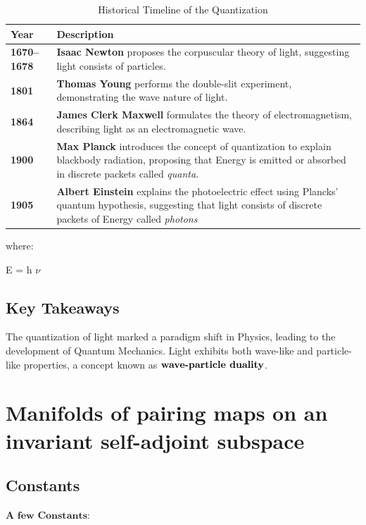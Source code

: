 \documentclass[a4paper, 10pt, onepage]{elegantbook}
\begin{document}
{\begin{table}[ht]
\centering
\caption{Historical Timeline of the Quantization}
\label{tab:quantization}
\begin{tabular}{|l|p{6cm}|}
\hline
\textbf{Year} & \textbf{Description} \\ \hline
\textbf{1670--1678}          &  \textbf{Isaac Newton} proposes the corpuscular theory of light, suggesting light 
consists of particles.  \\ \hline    \textbf{1801}                &  \textbf{Thomas Young} performs the double-slit 
experiment, demonstrating the wave nature of light. \\    \hline
\textbf{1864}                &  \textbf{James Clerk Maxwell} formulates the theory of electromagnetism, describing 
light as an electromagnetic wave.  \\ \hline
\textbf{1900}                &  \textbf{Max Planck} introduces the concept of quantization to explain blackbody 
radiation, proposing that Energy is emitted or absorbed in discrete packets called \textit{quanta}. \\  \hline
\textbf{1905}                &  \textbf{Albert Einstein} explains the photoelectric effect using Plancks' quantum 
hypothesis, suggesting that light consists of discrete packets of Energy called \textit{photons}  \\  \hline
\end{tabular}
\end{table}

where:  
\noindent

E = h $\nu$ 


\subsection{Key Takeaways}

The quantization of light marked a paradigm shift in Physics, leading to the development of Quantum Mechanics. Light 
exhibits both wave-like and particle-like properties, a concept known as $\textbf{wave-particle 
duality\index{wave-particle duality}}$.

\section{Manifolds of pairing maps on an invariant self-adjoint subspace} \label{sec:Manifolds of pairing maps on an 
invariant self-adjoint subspace}

\subsection{Constants}
$\mathbf{\textbf{A few Constants:}}$  

}
\end{document}

